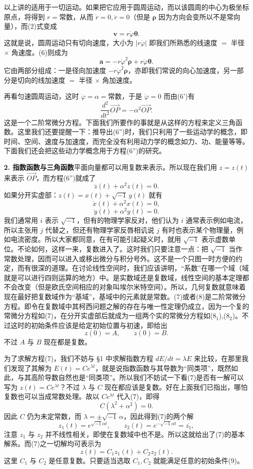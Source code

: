 以上讲的适用于一切运动。如果把它应用于圆周运动，而以该圆周的中心为极坐标原点，将得到 $r=\text{常数}$，从而 $\dot r=0,\ddot r=0$（但是 $\boldsymbol\rho$ 因为方向会变所以不是常向量），而(2)式变成
\[
\boldsymbol v=r\dot\varphi\boldsymbol\theta. \tag{2'}
\]
这就是说，圆周运动只有切向速度，大小为 $|r\dot\varphi|$ 即我们所熟悉的线速度 $=$ 半径 $\times$ 角速度。(6)则成为
\[
\boldsymbol a=-r\dot\varphi^2\boldsymbol\rho+r\ddot\varphi\boldsymbol\theta. \tag{6'}
\]
它由两部分组成：一是径向加速度 $-r\dot\varphi^2\boldsymbol\rho$，亦即我们常说的向心加速度，另一部分是切向的线加速度 $=$ 半径 $\times$ 角加速度。

再看匀速圆周运动，这时 $\dot\varphi=\alpha=\text{常数}$，于是 $\ddot\varphi=0$ 而由(6')有
\[
\frac{d^2}{dt^2}\overrightarrow{OP}=-\alpha^2\overrightarrow{OP}. \tag{6''}
\]
这是一个二阶常微分方程。下面我们所要作的事就是从这样的方程来定义三角函数。这里我们还要提醒一下：推导出(6'')时，我们只利用了一些运动学的概念，即时间、空间、速度与加速度，而完全没有利用动力学的概念如力、功、能量等等。下面我们还会把这些动力学概念用于方程(6'')的研究。

\textbf{2. 指数函数与三角函数}\quad 平面向量都可以用复数来表示。所以现在我们用 $z=z(t)$ 来表示 $\overrightarrow{OP}$，而方程(6'')就成了
\[
\ddot z(t)+\alpha^2z(t)=0. \tag{7}
\]
如果分开实虚部：$z(t)=x(t)+\sqrt{-1}\,y(t)$ 就有
\[
\ddot x(t)+\alpha^2x(t)=0, \tag{8$_1$}
\]
\[
\ddot y(t)+\alpha^2y(t)=0. \tag{8$_2$}
\]
我们通常用 $i$ 表示 $\sqrt{-1}$，但有的物理学家反对，他们认为 $i$ 通常表示例如电流，所以主张用 $j$ 代替之，但还有物理学家反唇相讥说 $j$ 有时也表示某个物理量，例如电流密度。所以大家都同意，在有可能引起疑义时，就用 $\sqrt{-1}$ 表示虚数单位。不论如何，这样一来，复数进入了。这时我们只要注意一点：把 $\sqrt{-1}$ 当作常数处理，因而可以进入或移出微分与积分号外。这不是一个只图一时方便的约定，而有很深的道理。在讨论线性空间时，我们应该讲明，“系数”在哪一个域（域就是可以进行四则运算的地方）中。是实数域还是复数域，线性空间的基本定理都不会改变（但是欧氏空间相应的对象叫埃尔米特空间）。所以，几何复数就意味着现在最好把复数域作为“基域”，基域中的元素就是常数。(7)或者(8)是二阶常微分方程。即令在复数域中其柯西问题之解的存在与唯一性定理仍成立，因为一个复的常微分方程如(7)，在分开实虚部后就成为一组两个实的常微分方程如(8$_1$),(8$_2$)。不过这时的初始条件应该是给定初始位置与初速，即给出
\[
z(0)=A,\qquad \dot z(0)=B. \tag{9}
\]
不过 $A$ 与 $B$ 现在都是复数。

为了求解方程(7)，我们不妨与 §1 中求解指数方程 $dE/dt=\lambda E$ 来比较，在那里我们发现了其解为 $E(t)=Ce^{\lambda t}$，就是说指数函数与其导数为“同类项”，既然如此，与其高阶导数自然也是“同类项”。所以我们不妨试一下看(7)是否有一解可以写为 $z(t)=Ce^{\lambda t}$？不过 $\lambda$ 与 $C$ 现在都应该是复数。好在上面我们已指出，哪怕复数也可以当成常数处理。故以 $Ce^{\lambda t}$ 代入(7)，即得
\[
C(\lambda^2+\alpha^2)=0.
\]
因此 $C$ 仍为未定常数，而 $\lambda=\pm\sqrt{-1}\,\alpha$，因此得到(7)的两个解
\[
z_1(t)=e^{\sqrt{-1}\alpha t},\qquad z_2(t)=e^{-\sqrt{-1}\alpha t}=\overline{z_1},
\]
注意 $z_1$ 与 $z_2$ 并不线性相关，即使在复数域中也不是。所以这就给出了(7)的基本解系。而(7)之一切解均可表示为
\[
z(t)=C_1z_1(t)+C_2z_2(t).
\]
这里 $C_1$ 与 $C_2$ 是任意复数。只要适当选取 $C_1,C_2$ 就能满足任意的初始条件(9)。

